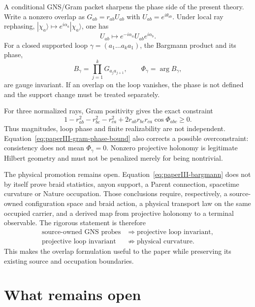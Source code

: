 \documentclass[11pt]{article}
\begin{document}
A conditional GNS/Gram packet sharpens the phase side of the present theory.
Write a nonzero overlap as $G_{ab}=r_{ab}U_{ab}$ with
$U_{ab}=e^{i\theta_{ab}}$.  Under local ray rephasing,
$|\chi_a\rangle\mapsto e^{i\alpha_a}|\chi_a\rangle$, one has
\begin{equation}
 U_{ab}\mapsto e^{-i\alpha_a}U_{ab}e^{i\alpha_b}.
\end{equation}
For a closed supported loop $\gamma=(a_1\ldots a_k a_1)$, the Bargmann
product and its phase,
\begin{equation}
 B_\gamma=\prod_{j=1}^{k}G_{a_j a_{j+1}},
 \qquad
 \Phi_\gamma=\arg B_\gamma,
 \label{eq:paperIII-bargmann}
\end{equation}
are gauge invariant.  If an overlap on the loop vanishes, the phase is not
defined and the support change must be treated separately.

For three normalized rays, Gram positivity gives the exact constraint
\begin{equation}
 1-r_{ab}^2-r_{bc}^2-r_{ca}^2
 +2r_{ab}r_{bc}r_{ca}\cos\Phi_{abc}\ge0.
 \label{eq:paperIII-gram-phase-bound}
\end{equation}
Thus magnitudes, loop phase and finite realizability are not independent.
Equation~\eqref{eq:paperIII-gram-phase-bound} also corrects a possible
overconstraint: consistency does not mean $\Phi_\gamma=0$.  Nonzero
projective holonomy is legitimate Hilbert geometry and must not be penalized
merely for being nontrivial.

The physical promotion remains open.  Equation~\eqref{eq:paperIII-bargmann}
does not by itself prove braid statistics, anyon support, a Parent
connection, spacetime curvature or Nature occupation.  Those conclusions
require, respectively, a source-owned configuration space and braid action,
a physical transport law on the same occupied carrier, and a derived map from
projective holonomy to a terminal observable.  The rigorous statement is
therefore
\begin{equation}
 \begin{aligned}
 \text{source-owned GNS probes}
 &\Longrightarrow \text{projective loop invariant},\\
 \text{projective loop invariant}
 &\not\Longrightarrow\text{physical curvature}.
 \end{aligned}
\end{equation}
This makes the overlap formulation useful to the paper while preserving its
existing source and occupation boundaries.

\section{What remains open}
\end{document}
